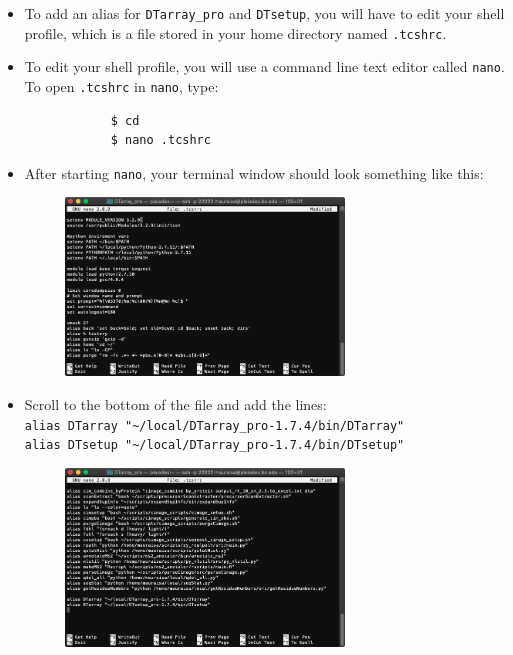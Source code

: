 \documentclass[12pt]{article}
\begin{document}
	\begin{itemize}
		\item To add an alias for \texttt{DTarray\_pro} and \texttt{DTsetup}, you will have to edit your shell profile, which is a file stored in your home directory named \texttt{.tcshrc}.
		
		\item To edit your shell profile, you will use a command line text editor called \texttt{nano}. To open \texttt{.tcshrc} in \texttt{nano}, type:
		
		\begin{lstlisting}
			$ cd
			$ nano .tcshrc
		\end{lstlisting}
		
		\item After starting \texttt{nano}, your terminal window should look something like this:
		
		\begin{figure}[h!]
			\centering
			\includegraphics[width=0.7\textwidth]{step_1.png}
		\end{figure}
		
		\item Scroll to the bottom of the file and add the lines: \\
		\texttt{alias DTarray "\textasciitilde/local/DTarray\_pro-1.7.4/bin/DTarray"} \\
		\texttt{alias DTsetup "\textasciitilde/local/DTarray\_pro-1.7.4/bin/DTsetup"}		
		
		\begin{figure}[h!]
			\centering
			\includegraphics[width=0.7\textwidth]{step_2.png}
		\end{figure}
	

\end{itemize}
\end{document}
